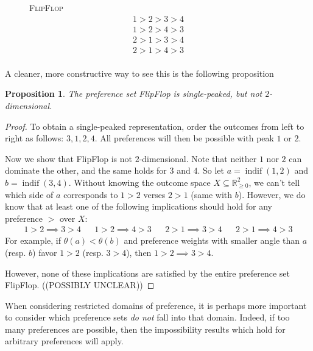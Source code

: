 \documentclass[12pt]{article}
\newtheorem{proposition}[theorem]{Proposition}
\newcommand{\Rgz}{\mathbb{R}_{\ge 0}}
\DeclareMathOperator*{\indif}{indif}
\newcommand{\1}[1]{\mathds{1}[{#1}]}
\begin{document}
  \begin{figure}
    \centering
    {\textsc{FlipFlop}}
    \begin{align*}
      1 > 2 > 3 > 4 \\
      1 > 2 > 4 > 3 \\
      2 > 1 > 3 > 4 \\
      2 > 1 > 4 > 3 \\
    \end{align*}
    \vspace{-2in}
  \end{figure}

  A cleaner, more constructive way to see this is the following proposition
  \begin{proposition}
    The preference set {\sc FlipFlop} is single-peaked, but not
    $2$-dimensional.
  \end{proposition}
  \begin{proof}
    To obtain a single-peaked representation, order the outcomes
    from left to right as follows: $3,1,2,4$.
    All preferences will then be possible with peak $1$ or $2$.

    Now we show that {\sc FlipFlop} is not $2$-dimensional.
    Note that neither $1$ nor $2$ can dominate the other,
    and the same holds for $3$ and $4$.
    So let $a=\indif(1,2)$ and $b=\indif(3,4)$.
    Without knowing the outcome space $X\subseteq \Rgz^2$,
    we can't tell which side of $a$ corresponds to $1 > 2$
    verses $2 > 1$ (same with $b$).
    However, we do know that at least one of the following implications should
    hold for any preference $>$ over $X$:
    \begin{align*}
      1 > 2 \implies 3 > 4
      && 1 > 2 \implies 4 > 3 &&
      2 > 1 \implies 3 > 4
      && 2 > 1 \implies 4 > 3
    \end{align*}
    For example, if $\theta(a) < \theta(b)$ and preference weights with smaller
    angle than $a$ (resp. $b$) favor $1 > 2$ (resp. $3 > 4$),
    then $1 > 2 \implies 3 > 4$.

    However, none of these implications are satisfied by the entire preference
    set {\sc FlipFlop}.
    ((POSSIBLY UNCLEAR))
  \end{proof}

  When considering restricted domains of preference, it is perhaps more
  important to consider which preference sets \emph{do not} fall into that
  domain. Indeed, if too many preferences are possible, then the impossibility
  results which hold for arbitrary preferences will apply.
\end{document}
